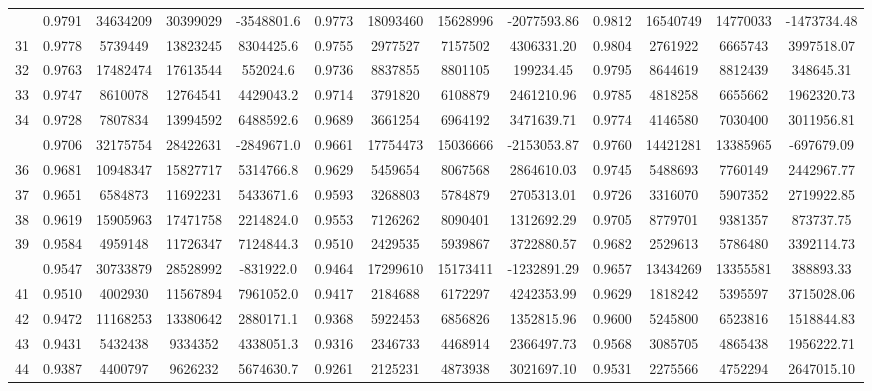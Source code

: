 \documentclass[
  12pt,
]{article}
\begin{document}
\begin{longtable}[t]{lcccccccccccc}
\addlinespace
30 & 0.9791 & 34634209 & 30399029 & -3548801.6 & 0.9773 & 18093460 & 15628996 & -2077593.86 & 0.9812 & 16540749 & 14770033 & -1473734.48\\
31 & 0.9778 & 5739449 & 13823245 & 8304425.6 & 0.9755 & 2977527 & 7157502 & 4306331.20 & 0.9804 & 2761922 & 6665743 & 3997518.07\\
32 & 0.9763 & 17482474 & 17613544 & 552024.6 & 0.9736 & 8837855 & 8801105 & 199234.45 & 0.9795 & 8644619 & 8812439 & 348645.31\\
33 & 0.9747 & 8610078 & 12764541 & 4429043.2 & 0.9714 & 3791820 & 6108879 & 2461210.96 & 0.9785 & 4818258 & 6655662 & 1962320.73\\
34 & 0.9728 & 7807834 & 13994592 & 6488592.6 & 0.9689 & 3661254 & 6964192 & 3471639.71 & 0.9774 & 4146580 & 7030400 & 3011956.81\\
\addlinespace
35 & 0.9706 & 32175754 & 28422631 & -2849671.0 & 0.9661 & 17754473 & 15036666 & -2153053.87 & 0.9760 & 14421281 & 13385965 & -697679.09\\
36 & 0.9681 & 10948347 & 15827717 & 5314766.8 & 0.9629 & 5459654 & 8067568 & 2864610.03 & 0.9745 & 5488693 & 7760149 & 2442967.77\\
37 & 0.9651 & 6584873 & 11692231 & 5433671.6 & 0.9593 & 3268803 & 5784879 & 2705313.01 & 0.9726 & 3316070 & 5907352 & 2719922.85\\
38 & 0.9619 & 15905963 & 17471758 & 2214824.0 & 0.9553 & 7126262 & 8090401 & 1312692.29 & 0.9705 & 8779701 & 9381357 & 873737.75\\
39 & 0.9584 & 4959148 & 11726347 & 7124844.3 & 0.9510 & 2429535 & 5939867 & 3722880.57 & 0.9682 & 2529613 & 5786480 & 3392114.73\\
\addlinespace
40 & 0.9547 & 30733879 & 28528992 & -831922.0 & 0.9464 & 17299610 & 15173411 & -1232891.29 & 0.9657 & 13434269 & 13355581 & 388893.33\\
41 & 0.9510 & 4002930 & 11567894 & 7961052.0 & 0.9417 & 2184688 & 6172297 & 4242353.99 & 0.9629 & 1818242 & 5395597 & 3715028.06\\
42 & 0.9472 & 11168253 & 13380642 & 2880171.1 & 0.9368 & 5922453 & 6856826 & 1352815.96 & 0.9600 & 5245800 & 6523816 & 1518844.83\\
43 & 0.9431 & 5432438 & 9334352 & 4338051.3 & 0.9316 & 2346733 & 4468914 & 2366497.73 & 0.9568 & 3085705 & 4865438 & 1956222.71\\
44 & 0.9387 & 4400797 & 9626232 & 5674630.7 & 0.9261 & 2125231 & 4873938 & 3021697.10 & 0.9531 & 2275566 & 4752294 & 2647015.10\\

\end{longtable}
\end{document}
